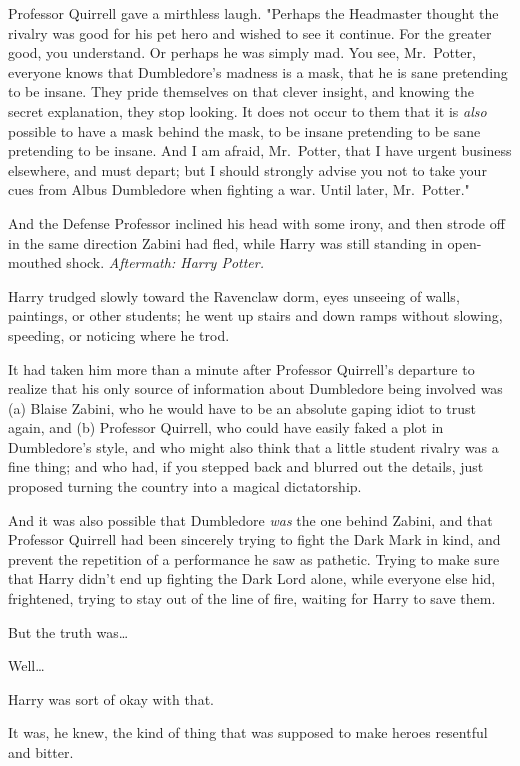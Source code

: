 Professor Quirrell gave a mirthless laugh. "Perhaps the Headmaster thought the 
rivalry was good for his pet hero and wished to see it continue. For the 
greater good, you understand. Or perhaps he was simply mad. You see, 
Mr.~Potter, everyone knows that Dumbledore's madness is a mask, that he is sane 
pretending to be insane. They pride themselves on that clever insight, and 
knowing the secret explanation, they stop looking. It does not occur to them 
that it is \emph{also} possible to have a mask behind the mask, to be insane 
pretending to be sane pretending to be insane. And I am afraid, Mr.~Potter, 
that I have urgent business elsewhere, and must depart; but I should strongly 
advise you not to take your cues from Albus Dumbledore when fighting a war. 
Until later, Mr.~Potter."

And the Defense Professor inclined his head with some irony, and then strode 
off in the same direction Zabini had fled, while Harry was still standing in 
open-mouthed shock.
\sbreak
\emph{Aftermath: Harry Potter.}

Harry trudged slowly toward the Ravenclaw dorm, eyes unseeing of walls, 
paintings, or other students; he went up stairs and down ramps without slowing, 
speeding, or noticing where he trod.

It had taken him more than a minute after Professor Quirrell's departure to 
realize that his only source of information about Dumbledore being involved was 
(a) Blaise Zabini, who he would have to be an absolute gaping idiot to trust 
again, and (b) Professor Quirrell, who could have easily faked a plot in 
Dumbledore's style, and who might also think that a little student rivalry was 
a fine thing; and who had, if you stepped back and blurred out the details, 
just proposed turning the country into a magical dictatorship.

And it was also possible that Dumbledore \emph{was} the one behind Zabini, and 
that Professor Quirrell had been sincerely trying to fight the Dark Mark in 
kind, and prevent the repetition of a performance he saw as pathetic. Trying to 
make sure that Harry didn't end up fighting the Dark Lord alone, while everyone 
else hid, frightened, trying to stay out of the line of fire, waiting for Harry 
to save them.

But the truth was{\ldots}

Well{\ldots}

Harry was sort of okay with that.

It was, he knew, the kind of thing that was supposed to make heroes resentful 
and bitter.


